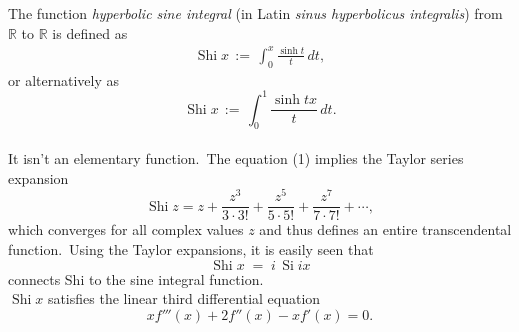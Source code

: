\documentclass[12pt]{article}
\DeclareMathOperator{\Shi}{Shi}
\DeclareMathOperator{\Si}{Si}
\theoremstyle{definition}
\begin{document}
The function {\em hyperbolic sine integral} (in Latin {\em sinus hyperbolicus integralis}) from $\mathbb{R}$ to $\mathbb{R}$ is defined as
\begin{align}
\Shi{x} \,:=\, \int_0^x\frac{\sinh t}{t}\,dt,
\end{align}
or alternatively as
$$\Shi{x} \,:=\, \int_0^1\frac{\sinh{tx}}{t}\,dt.$$\\

It isn't an elementary function.\, The equation (1) implies the Taylor series expansion
   $$\Shi{z} = z\!+\!\frac{z^3}{3\!\cdot\!3!}\!+\!\frac{z^5}{5\!\cdot\!5!}
                \!+\!\frac{z^7}{7\!\cdot\!7!}\!+\cdots,$$
which converges for all complex values $z$ and thus defines an entire transcendental function.\, 
Using the Taylor expansions, it is easily seen that
$$\Shi x \;=\; i\,\Si{ix}$$
connects Shi to the sine integral function.\\

$\Shi{x}$ satisfies the linear third  differential equation
          $$xf'''(x)\!+\!2f''(x)\!-\!xf'(x) = 0.$$

\end{document}
